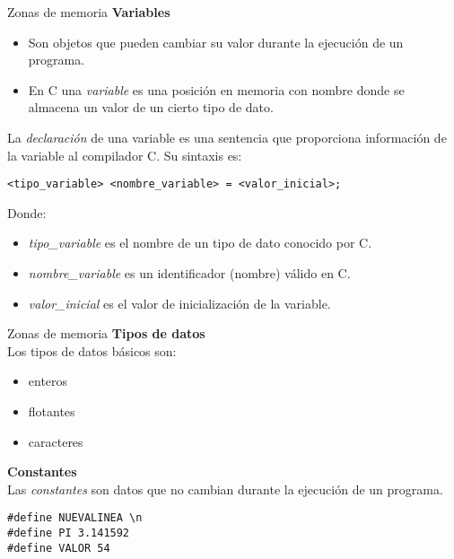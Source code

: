 \begin{frame}[fragile, t]{Zonas de memoria}
	\textbf{Variables}\\
	\footnotesize
	\begin{itemize}
		\item Son objetos que pueden cambiar su valor durante la ejecución de un programa.
		\item En C una \textit{variable} es una posición en memoria con nombre donde se almacena un valor de un cierto tipo de dato.
	\end{itemize}
	\vspace{-2mm}
	La \textit{declaración} de una variable es una sentencia que proporciona información de la variable al compilador C. Su sintaxis es:
	\begin{lstlisting}
<tipo_variable> <nombre_variable> = <valor_inicial>;
\end{lstlisting}
	\vspace{-4mm}
	Donde:
	\vspace{-4mm}
	\begin{itemize}
		\item \textit{tipo\_variable} es el nombre de un tipo de dato conocido por C.
		\item \textit{nombre\_variable} es un identificador (nombre) válido en C.
		\item \textit{valor\_inicial} es el valor de inicialización de la variable.
	\end{itemize}
\end{frame}

\begin{frame}[t, fragile]{Zonas de memoria}
	\textbf{Tipos de datos}\\
	\footnotesize
	Los tipos de datos básicos son:
	\begin{itemize}
		\item enteros
		\item flotantes
		\item caracteres
	\end{itemize}
	\textbf{Constantes}\\
	Las \textit{constantes} son datos que no cambian durante la ejecución de un programa.
	\begin{lstlisting}
#define NUEVALINEA \n 
#define PI 3.141592 
#define VALOR 54
\end{lstlisting}
\end{frame}


